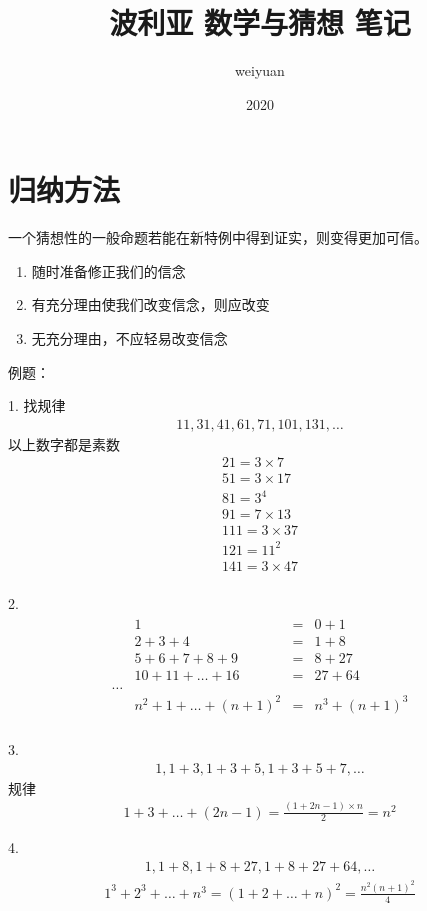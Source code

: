 \documentclass[10pt,a4paper]{book}
\title{波利亚 数学与猜想 笔记}
\author{weiyuan}
\date{2020}
\begin{document}
	\maketitle
	\chapter{归纳方法}
	一个猜想性的一般命题若能在新特例中得到证实，则变得更加可信。\\
	\begin{enumerate}
		\item 随时准备修正我们的信念
		\item 有充分理由使我们改变信念，则应改变
		\item 无充分理由，不应轻易改变信念
	\end{enumerate}
	
	例题：
	
	1. 找规律
	\begin{gather*}
		11, 31, 41, 61, 71, 101, 131, \dots
	\end{gather*}
	以上数字都是素数
	\begin{gather*}
		21 = 3 \times 7\\
		51 = 3 \times 17\\
		81 = 3^4\\
		91 = 7 \times 13\\
		111 = 3 \times 37 \\
		121 = 11^2 \\
		141 = 3 \times 47\\
	\end{gather*}

	2. 
	\begin{gather*}
		\begin{aligned}
		&1			&=&0+1	\\
		&2+3+4		&=&1+8	\\
		&5+6+7+8+9	&=&8+27	\\
		&10+11+\dots+16	&=&27+64 \\
		\dots \\
		&n^2+1 + \dots + (n+1)^2 &=& n^3+(n+1)^3\\
		\end{aligned}
	\end{gather*}
	
	3.
	\begin{gather*}
		1,1+3,1+3+5,1+3+5+7,\dots
	\end{gather*}
	规律\\
	\begin{gather*}
		1+3+\dots +(2n-1) = \frac{(1+2n-1)\times n}{2} = n^2
	\end{gather*}
	
	4.
	\begin{gather*}
		1,1+8,1+8+27,1+8+27+64, \dots
	\end{gather*}
	\begin{gather*}
		1^3+2^3+\dots + n^3 = (1+2+\dots+n)^2 = \frac{n^2(n+1)^2}{4}
	\end{gather*}

	
\end{document}
